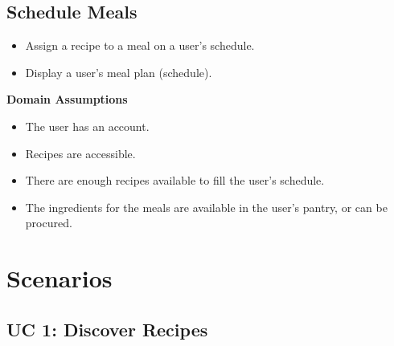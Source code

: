 \documentclass[11pt, letterpaper]{report}
\begin{document}
\section{Schedule Meals}
\begin{itemize}
    \item Assign a recipe to a meal on a user’s schedule.
    \item Display a user’s meal plan (schedule).
\end{itemize}
\textbf{Domain Assumptions}
\begin{itemize}
    \item The user has an account.
    \item Recipes are accessible.
    \item There are enough recipes available to fill the user’s schedule.
    \item The ingredients for the meals are available in the user’s pantry, or can be procured.
\end{itemize}

\chapter{Scenarios}
\section{UC 1: Discover Recipes}
\end{document}
